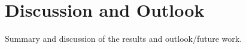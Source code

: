 \chapter{Discussion and Outlook}\label{chap:discussion}

Summary and discussion of the results and outlook/future work.
